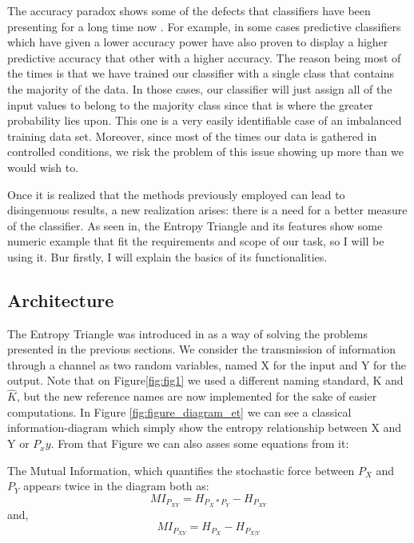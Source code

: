 The accuracy paradox shows some of the defects that classifiers have been presenting for a long time now . For example, in some cases predictive classifiers which have given a lower accuracy power have also proven to display a higher predictive accuracy that other with a higher accuracy. The reason being most of the times is that we have trained our classifier with a single class that contains the majority of the data. In those cases, our classifier will just assign all of the input values to belong to the majority class since that is where the greater probability lies upon. This one is a very easily identifiable case of an imbalanced training data set. Moreover, since most of the times our data is gathered in controlled conditions, we risk the problem of this issue showing up more than we would wish to.\par

Once it is realized that the methods previously employed can lead to disingenuous results, a new realization arises: there is a need for a better measure of the classifier. As seen in, the Entropy Triangle and its features show some numeric example that fit the requirements and scope of our task, so I will be using it. Bur firstly, I will explain the basics of its functionalities.\par

\subsection{Architecture}

The Entropy Triangle was introduced in \cite{val:pel:10b} as a way of solving the problems presented in the previous sections. We consider the transmission of information through a channel as two random variables, named X for the input and Y for the output. Note that on Figure\ref{fig:fig1} we used a different naming standard, K and $\hat{K}$, but the new reference names are now implemented for the sake of easier computations. In Figure \ref{fig:figure_diagram_et} we can see a classical information-diagram which simply show the entropy relationship between X and Y or $P_xy$. From that Figure we can also asses some equations from it:\par

The Mutual Information, which quantifies the stochastic force between $P_X$ and $P_Y$ appears twice in the diagram both as:
\begin{equation}\label{eq:mutual_information_1}
MI_{P_{XY}} = H_{P_X * P_Y} - H_{P_{XY}}
\end{equation}
and,
\begin{equation}\label{eq:mutual_information_2}
MI_{P_{XY}} = H_{P_X} - H_{P_{X|Y}}
\end{equation}

